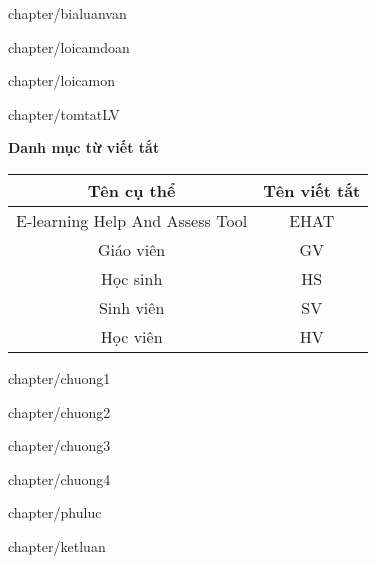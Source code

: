 \documentclass[12pt, a4paper, reqno, oneside]{report}
\begin{document}
	\makeatletter
	\renewcommand{\ps@myheadings}{
		\renewcommand{\@oddhead}{\textsf{Luận văn tốt nghiệp - công nghệ thông tin}\hfil\textrm{\thepage}}
		\renewcommand{\@oddfoot}{\textsf{Phan Minh Cường, Khoa Khoa học \& Kỹ thuật máy tính}\hfil}
	}
	
	\newpage
	 {chapter/bialuanvan}
	
	
	\newpage
	 {chapter/loicamdoan}
	
	\newpage
	 {chapter/loicamon}
	
	\newpage
	 {chapter/tomtatLV}
	
	\newpage
	\tableofcontents
	
	\newpage
	{\huge\bf Danh mục từ viết tắt} 
	
	\begin{center}
		\begin{table}[!htp]
			\centering
			\begin{tabular}{|c|c|}
				\hline 
				Tên cụ thể & Tên viết tắt \\ 
				\hline 
				E-learning Help And Assess Tool & EHAT \\ 
				\hline 
				Giáo viên & GV \\ 
				\hline 
				Học sinh & HS \\ 
				\hline 
				Sinh viên & SV \\ 
				\hline 
				Học viên & HV \\ 
				\hline 
			\end{tabular}
			\label{bang}
		\end{table}
	\end{center}
	
	\newpage
	\listoftables
	
	\newpage
	\listoffigures

	\newpage
	 {chapter/chuong1}
	
	\newpage
	 {chapter/chuong2}
	
	\newpage
	 {chapter/chuong3}
	
	\newpage
	 {chapter/chuong4}
	
	\newpage
	 {chapter/phuluc}
	
	\newpage
	 {chapter/ketluan}
	
	\printbibliography
\end{document}
